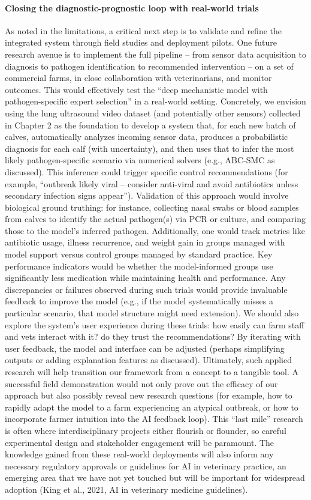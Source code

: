 \paragraph{Closing the diagnostic-prognostic loop with real-world trials} As noted in the limitations, a critical next step is to validate and refine the integrated system through field studies and deployment pilots. One future research avenue is to implement the full pipeline – from sensor data acquisition to diagnosis to pathogen identification to recommended intervention – on a set of commercial farms, in close collaboration with veterinarians, and monitor outcomes. This would effectively test the “deep mechanistic model with pathogen-specific expert selection” in a real-world setting. Concretely, we envision using the lung ultrasound video dataset (and potentially other sensors) collected in Chapter 2 as the foundation to develop a system that, for each new batch of calves, automatically analyzes incoming sensor data, produces a probabilistic diagnosis for each calf (with uncertainty), and then uses that to infer the most likely pathogen-specific scenario via numerical solvers (e.g., ABC-SMC as discussed). This inference could trigger specific control recommendations (for example, “outbreak likely viral – consider anti-viral and avoid antibiotics unless secondary infection signs appear”). Validation of this approach would involve biological ground truthing: for instance, collecting nasal swabs or blood samples from calves to identify the actual pathogen(s) via PCR or culture, and comparing those to the model’s inferred pathogen. Additionally, one would track metrics like antibiotic usage, illness recurrence, and weight gain in groups managed with model support versus control groups managed by standard practice. Key performance indicators would be whether the model-informed groups use significantly less medication while maintaining health and performance. Any discrepancies or failures observed during such trials would provide invaluable feedback to improve the model (e.g., if the model systematically misses a particular scenario, that model structure might need extension). We should also explore the system’s user experience during these trials: how easily can farm staff and vets interact with it? do they trust the recommendations? By iterating with user feedback, the model and interface can be adjusted (perhaps simplifying outputs or adding explanation features as discussed). Ultimately, such applied research will help transition our framework from a concept to a tangible tool. A successful field demonstration would not only prove out the efficacy of our approach but also possibly reveal new research questions (for example, how to rapidly adapt the model to a farm experiencing an atypical outbreak, or how to incorporate farmer intuition into the AI feedback loop). This “last mile” research is often where interdisciplinary projects either flourish or flounder, so careful experimental design and stakeholder engagement will be paramount. The knowledge gained from these real-world deployments will also inform any necessary regulatory approvals or guidelines for AI in veterinary practice, an emerging area that we have not yet touched but will be important for widespread adoption (King et al., 2021, AI in veterinary medicine guidelines).

